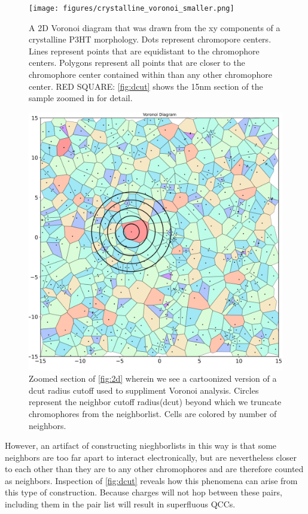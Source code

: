 \begin{figure}
  \center
  \texttt{[image: figures/crystalline\_voronoi\_smaller.png]} 
  \caption{A 2D Voronoi diagram that was drawn from the xy components of a crystalline P3HT morphology. Dots
    represent chromopore centers. Lines represent points that are equidistant to the chromophore centers.
    Polygons represent all points that are closer to the chromophore center contained within than any other
    chromophore center. RED SQUARE: \autoref{fig:dcut} shows the 15nm section of the sample zoomed in for
    detail.}
  \label{fig:2d}
\end{figure}
\begin{figure}
  \center
  \includegraphics[width=\linewidth]{figures/crystalline_voronoi_d_cut_circles.png} 
    \caption{Zoomed section of \autoref{fig:2d} wherein we see a cartoonized version of a dcut radius cutoff
    used to suppliment Voronoi analysis. Circles represent the neighbor cutoff
    radius(dcut) beyond which we truncate chromophores from the neighborlist.
    Cells are colored by number of neighbors.}
  \label{fig:dcut}
\end{figure}

However, an artifact of constructing nieghborlists in this way is that some
neighbors are too far apart to interact electronically, but are nevertheless closer to each other than they
are to any other chromophores and are therefore counted as neighbors. 
Inspection of \autoref{fig:dcut} reveals how this phenomena can arise from this type of construction.
Because charges will not hop between these pairs, including them in the pair list will result in 
superfluous QCCs. 

